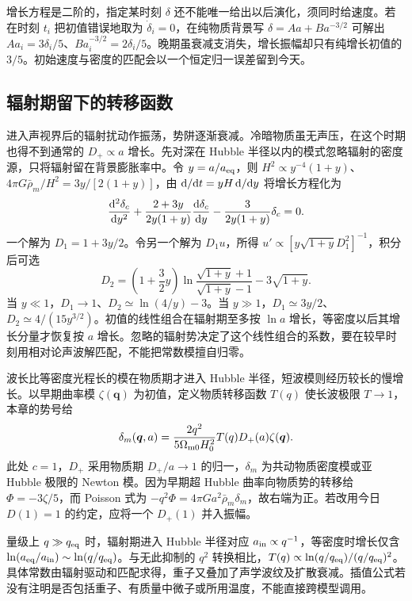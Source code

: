 增长方程是二阶的，指定某时刻 $\delta$ 还不能唯一给出以后演化，须同时给速度。若在时刻 $t_i$ 把初值错误地取为 $\dot\delta_i=0$，在纯物质背景写 $\delta=Aa+Ba^{-3/2}$ 可解出 $Aa_i=3\delta_i/5$、$Ba_i^{-3/2}=2\delta_i/5$。晚期虽衰减支消失，增长振幅却只有纯增长初值的 $3/5$。初始速度与密度的匹配会以一个恒定归一误差留到今天。


\subsection{辐射期留下的转移函数}

进入声视界后的辐射扰动作振荡，势阱逐渐衰减。冷暗物质虽无声压，在这个时期也得不到通常的 $D_+\propto a$ 增长。先对深在 Hubble 半径以内的模式忽略辐射的密度源，只将辐射留在背景膨胀率中。令 $y=a/a_{\rm eq}$，则 $H^2\propto y^{-4}(1+y)$、$4\pi G\bar\rho_m/H^2=3y/[2(1+y)]$，由 $\dd/\dd t=yH\,\dd/\dd y$ 将增长方程化为
\begin{equation}\label{eq:cosmo-meszaros}
 \frac{\dd^2\delta_c}{\dd y^2}
 +\frac{2+3y}{2y(1+y)}\frac{\dd\delta_c}{\dd y}
 -\frac{3}{2y(1+y)}\delta_c=0 .
\end{equation}
一个解为 $D_1=1+3y/2$。令另一个解为 $D_1u$，所得 $u'\propto[y\sqrt{1+y}D_1^2]^{-1}$，积分后可选
\[
 D_2=\left(1+\frac32y\right)
       \ln\frac{\sqrt{1+y}+1}{\sqrt{1+y}-1}-3\sqrt{1+y}.
\]
当 $y\ll1$，$D_1\to1$、$D_2\simeq\ln(4/y)-3$。当 $y\gg1$，$D_1\simeq3y/2$、$D_2\simeq4/(15y^{3/2})$。初值的线性组合在辐射期至多按 $\ln a$ 增长，等密度以后其增长分量才恢复按 $a$ 增长。忽略的辐射势决定了这个线性组合的系数，要在较早时刻用相对论声波解匹配，不能把常数模擅自归零。

波长比等密度光程长的模在物质期才进入 Hubble 半径，短波模则经历较长的慢增长。以早期曲率模 $\zeta(\bm q)$ 为初值，定义物质转移函数 $T(q)$ 使长波极限 $T\to1$，本章的势号给
\begin{equation}\label{eq:cosmo-transfer-density}
 \delta_m(\bm q,a)=\frac{2q^2}{5\Omega_{\rm m0}H_0^2}
                     T(q)D_+(a)\zeta(\bm q).
\end{equation}
此处 $c=1$，$D_+$ 采用物质期 $D_+/a\to1$ 的归一，$\delta_m$ 为共动物质密度模或亚 Hubble 极限的 Newton 模。因为早期超 Hubble 曲率向物质势的转移给 $\Phi=-3\zeta/5$，而 Poisson 式为 $-q^2\Phi=4\pi Ga^2\bar\rho_m\delta_m$，故右端为正。若改用今日 $D(1)=1$ 的约定，应将一个 $D_+(1)$ 并入振幅。

量级上 $q\gg q_{\rm eq}$ 时，辐射期进入 Hubble 半径对应 $a_{\rm in}\propto q^{-1}$，等密度时增长仅含 $\ln(a_{\rm eq}/a_{\rm in})\sim\ln(q/q_{\rm eq})$。与无此抑制的 $q^2$ 转换相比，$T(q)\propto \ln(q/q_{\rm eq})/(q/q_{\rm eq})^2$。具体常数由辐射驱动和匹配求得，重子又叠加了声学波纹及扩散衰减。插值公式若没有注明是否包括重子、有质量中微子或所用温度，不能直接跨模型调用。

